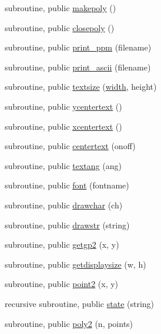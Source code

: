 \begin{DoxyCompactItemize}
subroutine, public \mbox{\hyperlink{namespacem__pixel_ab7128437f95b40004bf73fc6e3f597f8}{makepoly}} ()
\item 
subroutine, public \mbox{\hyperlink{namespacem__pixel_ab3dc83b63d2ab1bf3f63932abca4245d}{closepoly}} ()
\item 
subroutine, public \mbox{\hyperlink{namespacem__pixel_a01797b04ce7c693c3fd6a841e8d1de48}{print\+\_\+ppm}} (filename)
\item 
subroutine, public \mbox{\hyperlink{namespacem__pixel_ab2bb47aea567667b1b92c8265bcb36fb}{print\+\_\+ascii}} (filename)
\item 
subroutine, public \mbox{\hyperlink{namespacem__pixel_a070e9fff1f2cd0c89d40c5d3c72b7f2c}{textsize}} (\mbox{\hyperlink{namespacem__pixel_abf266872f93a04af39d2903fb20d2a0d}{width}}, height)
\item 
subroutine, public \mbox{\hyperlink{namespacem__pixel_a2e32105b5e77abf38768fec6b11376a3}{ycentertext}} ()
\item 
subroutine, public \mbox{\hyperlink{namespacem__pixel_a1e0c43d36b35eafea921f91c31d8a478}{xcentertext}} ()
\item 
subroutine, public \mbox{\hyperlink{namespacem__pixel_a9ddc8e8604bbc3181c728f08a6b87904}{centertext}} (onoff)
\item 
subroutine, public \mbox{\hyperlink{namespacem__pixel_a5e213461e9894b99c9e8f278d5c4a858}{textang}} (ang)
\item 
subroutine, public \mbox{\hyperlink{namespacem__pixel_a566adb827a3a26ba42d4e86e4c6e12af}{font}} (fontname)
\item 
subroutine, public \mbox{\hyperlink{namespacem__pixel_a58406ffd6c2a9fdf2ea7772198b54255}{drawchar}} (ch)
\item 
subroutine, public \mbox{\hyperlink{namespacem__pixel_a6fa0c2d531d1ac74840aa2f0e2b050e0}{drawstr}} (string)
\item 
subroutine, public \mbox{\hyperlink{namespacem__pixel_a626d769d3dae0c292e3ef1617ad43efb}{getgp2}} (x, y)
\item 
subroutine, public \mbox{\hyperlink{namespacem__pixel_acacbc4462423b9aa0f591cbe7aba4ec6}{getdisplaysize}} (w, h)
\item 
subroutine, public \mbox{\hyperlink{namespacem__pixel_a11234e0b33104eb0afb24f928b072053}{point2}} (x, y)
\item 
recursive subroutine, public \mbox{\hyperlink{namespacem__pixel_aa24c465b23b0ddda341e97bc206fe249}{state}} (string)
\item 
subroutine, public \mbox{\hyperlink{namespacem__pixel_a996117d631dce0e92056a0c486be5109}{poly2}} (n, points)

\end{DoxyCompactItemize}
